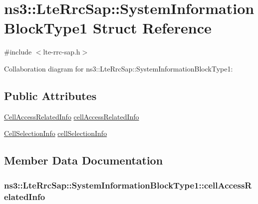 \hypertarget{structns3_1_1LteRrcSap_1_1SystemInformationBlockType1}{}\section{ns3\+:\+:Lte\+Rrc\+Sap\+:\+:System\+Information\+Block\+Type1 Struct Reference}
\label{structns3_1_1LteRrcSap_1_1SystemInformationBlockType1}


{\ttfamily \#include $<$lte-\/rrc-\/sap.\+h$>$}



Collaboration diagram for ns3\+:\+:Lte\+Rrc\+Sap\+:\+:System\+Information\+Block\+Type1\+:
\subsection*{Public Attributes}
\begin{DoxyCompactItemize}
\item 
\hyperlink{structns3_1_1LteRrcSap_1_1CellAccessRelatedInfo}{Cell\+Access\+Related\+Info} \hyperlink{structns3_1_1LteRrcSap_1_1SystemInformationBlockType1_af5ec0ff87a68ba57ee3dc77a4f878651}{cell\+Access\+Related\+Info}
\item 
\hyperlink{structns3_1_1LteRrcSap_1_1CellSelectionInfo}{Cell\+Selection\+Info} \hyperlink{structns3_1_1LteRrcSap_1_1SystemInformationBlockType1_a6bfea3cb2d56cbd15ae5afbc13944f71}{cell\+Selection\+Info}
\end{DoxyCompactItemize}


\subsection{Member Data Documentation}
\subsubsection[{\texorpdfstring{cell\+Access\+Related\+Info}{cellAccessRelatedInfo}}]{ ns3\+::\+Lte\+Rrc\+Sap\+::\+System\+Information\+Block\+Type1\+::cell\+Access\+Related\+Info}\hypertarget{structns3_1_1LteRrcSap_1_1SystemInformationBlockType1_af5ec0ff87a68ba57ee3dc77a4f878651}{}\label{structns3_1_1LteRrcSap_1_1SystemInformationBlockType1_af5ec0ff87a68ba57ee3dc77a4f878651}
